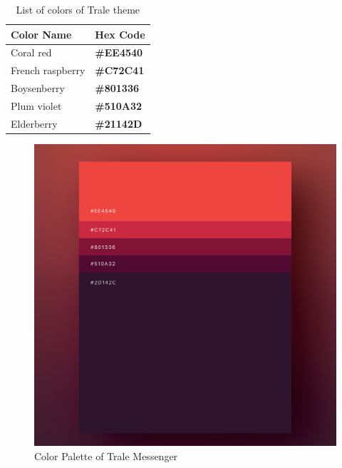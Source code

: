 \begin{table}[H]
    \centering
    \begin{tabular}{|l|l|}
        \hline
        \textbf{Color Name} & \textbf{Hex Code}                     \\ \hline
        Coral red           & \color[HTML]{EE4540}\textbf{\#EE4540} \\ \hline
        French raspberry    & \color[HTML]{C72C41}\textbf{\#C72C41} \\ \hline
        Boysenberry         & \color[HTML]{801336}\textbf{\#801336} \\ \hline
        Plum violet         & \color[HTML]{510A32}\textbf{\#510A32} \\ \hline
        Elderberry          & \color[HTML]{21142D}\textbf{\#21142D} \\ \hline
    \end{tabular}
    \caption{List of colors of Trale theme}
    \label{tab:colorTable}
\end{table}

\begin{figure}[H]
    \centering
    \includegraphics[height=0.6\textheight]{./images/colorPalette}
    \caption{Color Palette of Trale Messenger}
    \label{fig:colorPalette}
\end{figure}

